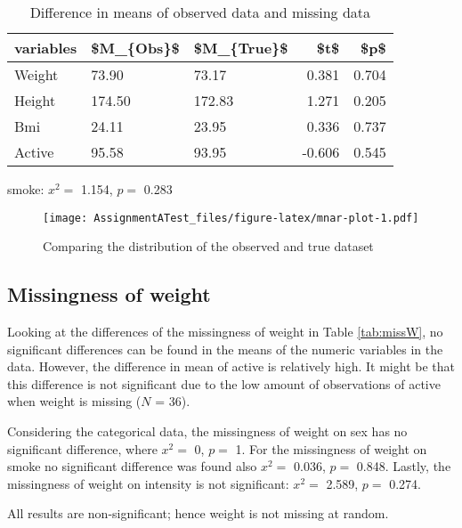 \documentclass[
]{article}
\begin{document}
\begin{table}

\caption{\label{tab:mnar-t}Difference in means of observed data and missing data}
\centering
\begin{tabular}[t]{l|l|l|r|r}
\hline
variables & \$M\_\{Obs\}\$ & \$M\_\{True\}\$ & \$t\$ & \$p\$\\
\hline
Weight & 73.90 & 73.17 & 0.381 & 0.704\\
\hline
Height & 174.50 & 172.83 & 1.271 & 0.205\\
\hline
Bmi & 24.11 & 23.95 & 0.336 & 0.737\\
\hline
Active & 95.58 & 93.95 & -0.606 & 0.545\\
\hline
\end{tabular}
\end{table}

smoke: \(x^2 =\) 1.154, \(p =\) 0.283

\begin{figure}
\centering
\texttt{[image: AssignmentATest\_files/figure-latex/mnar-plot-1.pdf]}
\caption{\label{fig:mnar-plot}Comparing the distribution of the observed and true dataset}
\end{figure}

\hypertarget{missW}{%
\subsection{Missingness of weight}\label{missW}}

Looking at the differences of the missingness of weight in Table \ref{tab:missW}, no significant differences can be found in the means of the numeric variables in the data. However, the difference in mean of active is relatively high. It might be that this difference is not significant due to the low amount of observations of active when weight is missing (\(N\) = 36).

Considering the categorical data, the missingness of weight on sex has no significant difference, where \(x^2 =\) 0, \(p =\) 1. For the missingness of weight on smoke no significant difference was found also \(x^2 =\) 0.036, \(p =\) 0.848. Lastly, the missingness of weight on intensity is not significant: \(x^2 =\) 2.589, \(p =\) 0.274.

All results are non-significant; hence weight is not missing at random.
\end{document}
